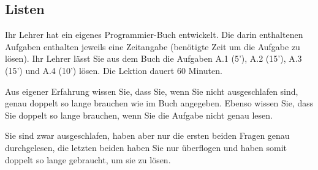 \newtoggle{withbonus} \toggletrue{withbonus} %

\newcommand{\mycourse}{Grundlagenfach Informatik}
\newcommand{\myclass}{2. Klassen}
\newcommand{\mydate}{09. November 2023}

\clearpage
\begin{questions}
\section*{Listen}

Ihr Lehrer hat ein eigenes Programmier-Buch entwickelt. Die darin enthaltenen Aufgaben enthalten jeweils eine Zeitangabe (benötigte Zeit um die Aufgabe zu lösen). Ihr Lehrer lässt Sie aus dem Buch die Aufgaben A.1 (5'), A.2 (15'), A.3 (15') und A.4 (10') lösen. Die Lektion dauert 60 Minuten.

Aus eigener Erfahrung wissen Sie, dass Sie, wenn Sie nicht ausgeschlafen sind, genau doppelt so lange brauchen wie im Buch angegeben. Ebenso wissen Sie, dass Sie doppelt so lange brauchen, wenn Sie die Aufgabe nicht genau lesen. 

Sie sind zwar ausgeschlafen, haben aber nur die ersten beiden Fragen genau durchgelesen, die letzten beiden haben Sie nur überflogen und haben somit doppelt so lange gebraucht, um sie zu lösen. 

\end{questions}
